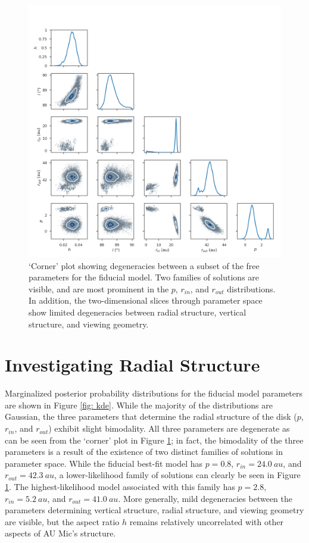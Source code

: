 \documentclass[12pt,oneside]{book}
\begin{document}
\begin{figure}
  \centering
  \includegraphics[width=0.9\linewidth]{../figures/degeneracy_corner}
  \caption{`Corner' plot showing degeneracies between a subset of the free parameters for the fiducial model.
  Two families of solutions are visible, and are most prominent in the $p$, $r_{in}$, and $r_{out}$ distributions.
  In addition, the two-dimensional slices through parameter space show limited degeneracies between radial structure, vertical structure, and viewing geometry.}
  \label{fig: degeneracies}
\end{figure}

\section{Investigating Radial Structure}
\label{section: radial analysis}

Marginalized posterior probability distributions for the fiducial model parameters are shown in Figure \ref{fig: kde}.
While the majority of the distributions are Gaussian, the three parameters that determine the radial structure of the disk ($p$, $r_{in}$, and $r_{out}$) exhibit slight bimodality. 
All three parameters are degenerate as can be seen from the `corner' plot in Figure \ref{fig: degeneracies}; in fact, the bimodality of the three parameters is a result of the existence of two distinct families of solutions in parameter space.
While the fiducial best-fit model has $p=0.8$, $r_{in}=\SI{24.0}{au}$, and $r_{out}=\SI{42.3}{au}$, a lower-likelihood family of solutions can clearly be seen in Figure \ref{fig: degeneracies}. The highest-likelihood model associated with this family has $p = 2.8$, $r_{in} = \SI{5.2}{au}$, and $r_{out} = \SI{41.0}{au}$.
More generally, mild degeneracies between the parameters determining vertical structure, radial  structure, and viewing geometry are visible, but the aspect ratio $h$ remains relatively uncorrelated with other aspects of AU Mic's structure.
\end{document}
